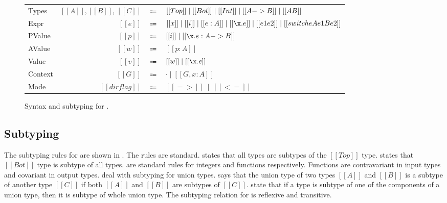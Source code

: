 \begin{figure}[t]
  \begin{small}
    \centering
    \begin{tabular}{lrcl} \toprule
      Types & $[[A]], [[B]]$, $[[C]]$ & $\Coloneqq$ & $ [[Top]] \mid [[Bot]] \mid [[Int]] \mid [[A -> B]] \mid [[A \/ B]] $ \\
      Expr & $[[e]]$ & $\Coloneqq$ & $[[x]] \mid [[i]] \mid [[e:A]] \mid [[\x.e]] \mid [[e1 e2]] \mid [[switch e A e1 B e2]]$\\
      PValue & $[[p]]$ & $\Coloneqq$ & $[[i]] \mid [[\x.e : A -> B]] $\\
      AValue & $[[w]]$ & $\Coloneqq$ & $[[p:A]]$\\
      Value & $[[v]]$ & $\Coloneqq$ & $[[w]] \mid [[\x.e]] $\\
      Context & $[[G]]$ & $\Coloneqq$ & $ \cdot \mid [[G , x : A]]$ \\
      Mode & $[[dirflag]]$ & $\Coloneqq$ & $[[=>]] \ \mid \ [[<=]]$ \\
      \bottomrule
    \end{tabular}
  \end{small}
  \begin{small}
    \centering
  \end{small}
  \caption{Syntax and subtyping for \cal.}
  \label{fig:union:syntax}
\end{figure}

\subsection{Subtyping}
\label{sec:union:sub}
The subtyping rules for \cal are shown in
. The rules are standard.
 states that all types are subtypes of
the $[[Top]]$ type.  states that $[[Bot]]$ type is subtype of
all types.  are standard rules for integers and
functions respectively.  Functions are contravariant in input types
and covariant in output types.  deal with
subtyping for union types.  says that the union type of two types $[[A]]$ and $[[B]]$
is a subtype of another type $[[C]]$ if both $[[A]]$ and $[[B]]$ are subtypes of
$[[C]]$.  state that if a
type is subtype of one of the components of a union type, then it is subtype of whole
union type.
The subtyping relation for \cal is reflexive and transitive.

